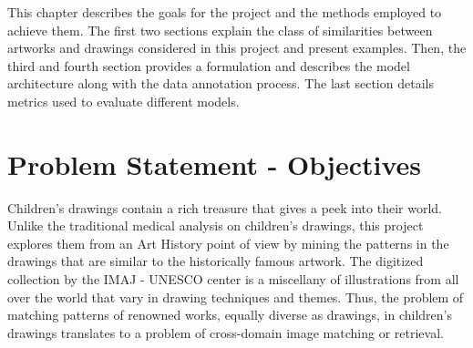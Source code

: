 This chapter describes the goals for the project and the methods employed to achieve them. The first two sections explain the class of similarities between artworks and drawings considered in this project and present examples. Then, the third and fourth section provides a formulation and describes the model architecture along with the data annotation process. The last section details metrics used to evaluate different models.

\section{Problem Statement - Objectives}\label{chap:4:sec:objectives}

Children's drawings contain a rich treasure that gives a peek into their world. Unlike the traditional medical analysis on children's drawings, this project explores them from an Art History point of view by mining the patterns in the drawings that are similar to the historically famous artwork. The digitized collection by the IMAJ - UNESCO center is a miscellany of illustrations from all over the world that vary in drawing techniques and themes. Thus, the problem of matching patterns of renowned works, equally diverse as drawings, in children's drawings translates to a problem of cross-domain image matching or retrieval. 


